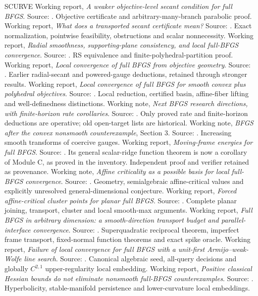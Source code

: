 \documentclass[10pt,oneside,openany]{book}
\theoremstyle{remark}\newtheorem{remark}{Remark}[chapter]
\begin{document}
\begin{thebibliography}{SCURVE}
 Working report, \emph{A weaker objective-level secant condition for full BFGS}. Source: . Objective certificate and arbitrary-many-branch parabolic proof.
 Working report, \emph{What does a transported secant certificate mean?} Source: . Exact normalization, pointwise feasibility, obstructions and scalar nonnecessity.
 Working report, \emph{Radial smoothness, supporting-plane consistency, and local full-BFGS convergence}. Source: . RS equivalence and finite-polyhedral-partition proof.
 Working report, \emph{Local convergence of full BFGS from objective geometry}. Source: . Earlier radial-secant and powered-gauge deductions, retained through stronger results.
 Working report, \emph{Local convergence of full BFGS for smooth convex plus polyhedral objectives}. Source: . Local reduction, certified basin, affine-fiber lifting and well-definedness distinctions.
 Working note, \emph{Next BFGS research directions, with finite-horizon rate corollaries}. Source: . Only proved rate and finite-horizon deductions are operative; old open-target lists are historical.
 Working note, \emph{BFGS after the convex nonsmooth counterexample}, Section 3. Source: . Increasing smooth transforms of coercive gauges.
 Working report, \emph{Moving-frame energies for full BFGS}. Source: . Its general scalar-ridge function theorem is now a corollary of Module C, as proved in the inventory. Independent proof and verifier retained as provenance.
 Working note, \emph{Affine criticality as a possible basis for local full-BFGS convergence}. Source: . Geometry, semialgebraic affine-critical values and explicitly unresolved general-dimensional conjecture.
 Working report, \emph{Forced affine-critical cluster points for planar full BFGS}. Source: . Complete planar joining, transport, cluster and local smooth-max arguments.
 Working report, \emph{Full BFGS in arbitrary dimension: a smooth-direction transport budget and parallel-interface convergence}. Source: . Superquadratic reciprocal theorem, imperfect frame transport, fixed-normal function theorems and exact spike oracle.
 Working report, \emph{Failure of local convergence for full BFGS with a unit-first Armijo--weak-Wolfe line search}. Source: . Canonical algebraic seed, all-query decisions and globally $C^{2,1}$ upper-regularity local embedding.
 Working report, \emph{Positive classical Hessian bounds do not eliminate nonsmooth full-BFGS counterexamples}. Source: . Hyperbolicity, stable-manifold persistence and lower-curvature local embeddings.
\end{thebibliography}

\end{document}
